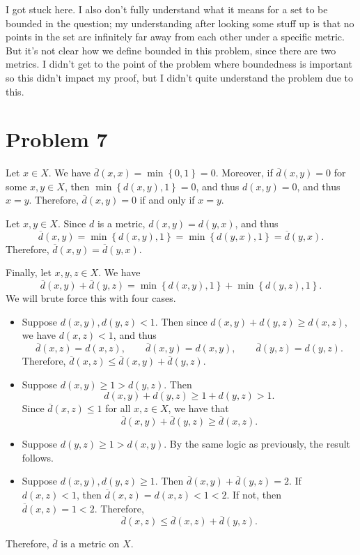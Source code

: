 \documentclass[11pt, letterpaper]{article}
\begin{document}
I got stuck here. I also don't fully understand what it means for a set to be bounded in the question; my understanding after looking some stuff up is that no points in the set are infinitely far away from each other under a specific metric. But it's not clear how we define bounded in this problem, since there are two metrics. I didn't get to the point of the problem where boundedness is important so this didn't impact my proof, but I didn't quite understand the problem due to this.
\section*{Problem 7}
Let $x\in X$. We have $\overline{d} (x,x)=\min \left\{ 0,1 \right\} =0$. Moreover, if $\overline{d} (x,y)=0$ for some $x,y\in X$, then $\min \left\{ d(x,y),1 \right\} =0$, and thus $d(x,y)=0$, and thus $x=y$. Therefore, $\overline{d} (x,y)=0$ if and only if $x=y$.

Let $x,y\in X$. Since $d$ is a metric, $d(x,y)=d(y,x)$, and thus
\[
	\overline{d} (x,y)=\min \left\{ d(x,y),1 \right\} =\min \left\{ d(y,x),1 \right\} =\overline{d} (y,x)
.\]
Therefore, $\overline{d} (x,y)=\overline{d} (y,x)$.

Finally, let $x,y,z\in X$. We have
\[
	\overline{d} (x,y)+\overline{d} (y,z)=\min \left\{ d(x,y),1 \right\} +\min \left\{ d(y,z),1 \right\} 
.\]
We will brute force this with four cases.
\begin{itemize}
	\item Suppose $d(x,y),d(y,z)<1$. Then since $d(x,y)+d(y,z)\geq d(x,z)$, we have $d(x,z)<1$, and thus
		\[
			\overline{d} (x,z)=d(x,z),\qquad \overline{d} (x,y)=d(x,y),\qquad \overline{d} (y,z)=d(y,z)
		.\]
		Therefore, $\overline{d} (x,z)\leq \overline{d} (x,y)+\overline{d} (y,z)$.
	\item Suppose $d(x,y)\geq 1>d(y,z)$. Then
		\[
			d(x,y)+d(y,z)\geq 1+d(y,z)>1
		.\]
		Since $\overline{d} (x,z)\leq 1$ for all $x,z\in X$, we have that
		\[
			\overline{d} (x,y)+\overline{d} (y,z)\geq \overline{d} (x,z)
		.\]
	\item Suppose $d(y,z)\geq 1>d(x,y)$. By the same logic as previously, the result follows.
	\item Suppose $d(x,y),d(y,z)\geq 1$. Then $\overline{d} (x,y)+\overline{d} (y,z)=2$. If $d(x,z)<1$, then $\overline{d} (x,z)=d(x,z)<1<2$. If not, then $\overline{d} (x,z)=1<2$. Therefore,
		\[
			\overline{d} (x,z)\leq \overline{d} (x,z)+\overline{d} (y,z)
		.\]
\end{itemize}
Therefore, $\overline{d} $ is a metric on $X$.
\end{document}
